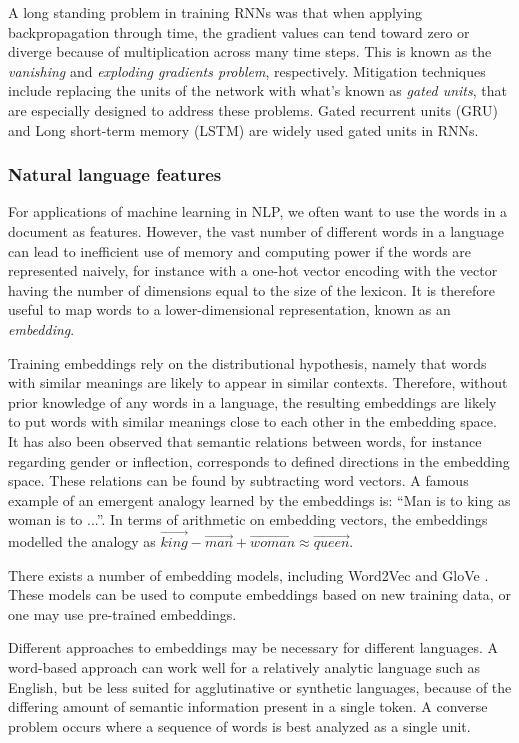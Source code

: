A long standing problem in training RNNs was that when applying
backpropagation through time, the gradient values can tend toward zero or
diverge because of multiplication across many time steps. This is known as
the \emph{vanishing} and \emph{exploding gradients problem}, respectively.
Mitigation techniques include replacing the units of the network with what's
known as \emph{gated units}, that are especially designed to address these
problems. Gated recurrent units (GRU) and Long short-term memory (LSTM) are
widely used gated units in RNNs.


\subsubsection{Natural language features}

For applications of machine learning in NLP, we often want to use the words
in a document as features. However, the vast number of different words in a
language can lead to inefficient use of memory and computing power if the
words are represented naively, for instance with a one-hot vector encoding
with the vector having the number of dimensions equal to the size of the
lexicon. It is therefore useful to map words to a lower-dimensional
representation, known as an \emph{embedding}.

\sloppy Training embeddings rely on the distributional hypothesis, namely
that words with similar meanings are likely to appear in similar contexts.
Therefore, without prior knowledge of any words in a language, the resulting
embeddings are likely to put words with similar meanings close to each other
in the embedding space. It has also been observed that semantic relations
between words, for instance regarding gender or inflection, corresponds to
defined directions in the embedding space\autocite{mikolov2013linguistic}.
These relations can be found by subtracting word vectors. A famous example of
an emergent analogy learned by the embeddings is: ``Man is to king as woman
is to ...''. In terms of arithmetic on embedding vectors, the embeddings
modelled the analogy as $\vec{king}-\vec{man}+\vec{woman}\approx\vec{queen}$.
\fussy

There exists a number of embedding models, including Word2Vec
\autocite{mikolov2013word2vec} and GloVe \autocite{pennington2014glove}.
These models can be used to compute embeddings based on new training data, or
one may use pre-trained embeddings.

Different approaches to embeddings may be necessary for different languages.
A word-based approach can work well for a relatively analytic language such
as English, but be less suited for agglutinative or synthetic languages,
because of the differing amount of semantic information present in a single
token. A converse problem occurs where a sequence of words is best analyzed
as a single unit.

